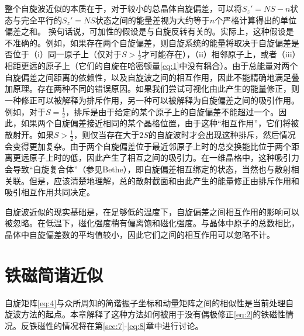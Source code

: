 \documentclass{article}
\begin{document}
整个自旋波近似的本质在于，对于较小的总晶体自旋偏差，可以将$S_z'=NS-n$状态与完全平行的$S_z'=NS$状态之间的能量差视为大约等于$n$个严格计算得出的单位偏差之和。
换句话说，可加性的假设是与自旋反转有关的。实际上，这种假设是不准确的。例如，如果存在两个自旋偏差，则自旋系统的能量将取决于自旋偏差是否位于（i）同一原子上（仅对于$S>\frac{1}{2}$才可能存在），（ii）相邻原子上，或者（iii）相距更远的原子上（它们的自旋在哈密顿量\eqref{eq:1}中没有耦合）。由于总能量对两个自旋偏差之间距离的依赖性，以及自旋波之间的相互作用，因此不能精确地满足叠加原理。存在两种不同的错误原因。如果我们尝试可视化由此产生的能量修正，则一种修正可以被解释为排斥作用，另一种可以被解释为自旋偏差之间的吸引作用。例如，对于$S=\frac{1}{2}$，排斥是由于给定的某个原子上的自旋偏差不能超过一个。因此，如果两个自旋偏差接近相同的某个晶格位置，由于这种“相互作用”，它们将被散射开。如果$S>\frac{1}{2}$，则仅当存在大于$2S$的自旋波时才会出现这种排斥，然后情况会变得更加复杂。由于两个自旋偏差位于最近邻原子上时的总交换能比位于两个距离更远原子上时的低，因此产生了相互之间的吸引力。在一维晶格中，这种吸引力会导致“自旋复合体”（参见Bethe），即自旋偏差相互绑定的状态，当然也与散射相关联。但是，应该清楚地理解，总的散射截面和由此产生的能量修正由排斥作用和吸引相互作用共同决定。

自旋波近似的现实基础是，在足够低的温度下，自旋偏差之间相互作用的影响可以被忽略。在低温下，磁化强度稍有偏离饱和磁化强度。与晶体中原子的总数相比，晶体中自旋偏差数的平均值较小，因此它们之间的相互作用可以忽略不计。




\section{铁磁简谐近似} \label{sec:3}

自旋矩阵\eqref{eq:4}与众所周知的简谐振子坐标和动量矩阵之间的相似性是当前处理自旋波方法的起点。本章解释了这种方法如何被用于没有偶极修正\eqref{eq:2}的铁磁性情况。反铁磁性的情况将在第\ref{sec:7}-\ref{eq:8}章中进行讨论。
\end{document}
